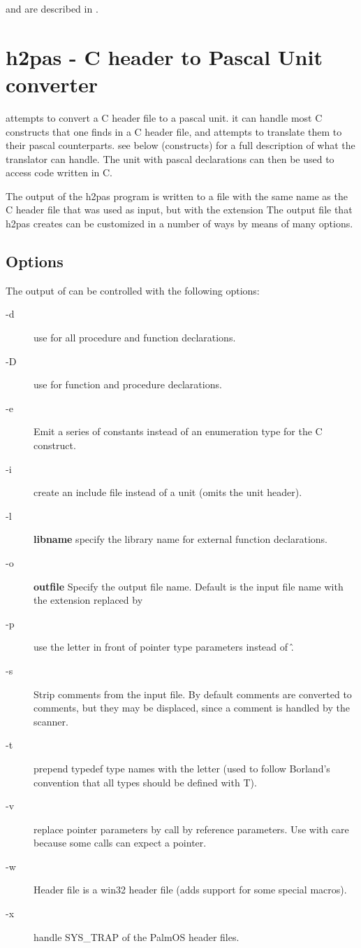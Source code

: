  and  are described in \fpdocref.

\section{h2pas - C header to Pascal Unit converter}
 attempts to convert a C header file to a pascal unit. 
it can handle most C constructs that one finds in a C header file,
and attempts to translate them to their pascal counterparts. see below
(constructs) for a full description of what the translator can handle.
The unit with pascal declarations can then be used to access code written in C.

The output of the h2pas program is written to a file with the same name as
the C header file that was used as input, but with the extension 
The output file that h2pas creates can be customized in a number of ways by
means of many options.

\subsection{Options}
The output of   can be controlled with the following options:

\begin{description}
\item[-d] use  for all procedure and function declarations.
\item[-D] use  for function and 
procedure declarations.
\item[-e] Emit a series of constants instead of an enumeration type for the 
C  construct. 
\item[-i] create an include file instead of a unit (omits the unit header).
\item[-l] \textbf{libname} specify the library name for external function 
declarations.
\item[-o] \textbf{outfile} Specify the output file name. Default is the input file name with 
the extension replaced by 
\item[-p] use the letter  in front of pointer type parameters instead of \^.
\item[-s] Strip comments from the input file. By default comments are converted
to comments, but they may be displaced, since a comment is handled by the
scanner.
\item[-t] prepend typedef type names with the letter  (used to follow 
Borland's convention that all types should be defined with T).
\item[-v] replace pointer parameters by call by reference parameters.
Use with care because some calls can expect a  pointer.
\item[-w] Header file is a win32 header file (adds support for some special macros).
\item[-x] handle SYS\_TRAP of the PalmOS header files.
\end{description}

